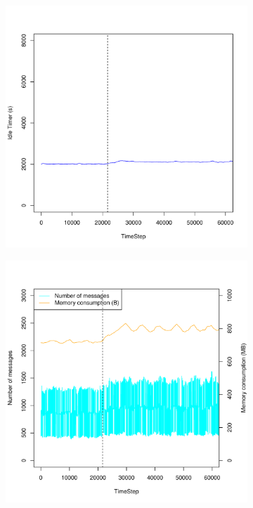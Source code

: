 \documentclass[a4j]{ujarticle}
\begin{document}
\begin{figure}[htbp]
\begin{subfigure}{0.49\hsize}
   \includegraphics[width=1.0\hsize]{scenario_6_idleTimer_345600_691200_1-35_0-000203_0_0_ideal_add_80000.pdf}
   \label{subfig:scenario_6_idleTimer_345600_691200_1-35_0-000203_0_0_ideal_add_80000}
 \end{subfigure}
 \par\bigskip %
 \begin{subfigure}{0.49\hsize}
   \centering
   \includegraphics[width=1.0\hsize]{scenario_6_signaling_and_memoryload_vs_timeStep_345600_691200_1-35_0-000203_0_0_ideal_add_80000.pdf}

\end{subfigure}
\end{figure}
\end{document}
